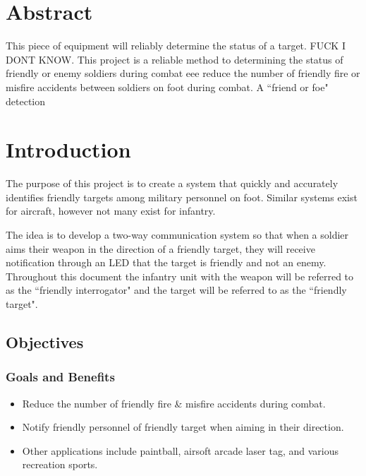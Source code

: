\documentclass[letterpaper,10pt]{article}
\newcommand{\buildtoc}{
	\clearpage
	\singlespacing
	\tableofcontents
	\onehalfspacing
}
\begin{document}
\maketitle
\pagestyle{fancy}
\begin{spacing}{1.15}


\color{black}
\section*{Abstract}
This piece of equipment will reliably determine the status of a target. FUCK I DONT KNOW. This project is a reliable method to determining the status of friendly or enemy soldiers during combat eee reduce the number of friendly fire or misfire accidents between soldiers on foot during combat. A ``friend or foe" detection 
\buildtoc
{}
\clearpage
\setcounter{page}{1}

\section{Introduction}
The purpose of this project is to create a system that quickly and accurately identifies friendly targets among military personnel on foot. Similar systems exist for aircraft, however not many exist for infantry.

The idea is to develop a two-way communication system so that when a soldier aims their weapon in the direction of a friendly target, they will receive notification through an LED that the target is friendly and not an enemy. Throughout this document the infantry unit with the weapon will be referred to as the ``friendly interrogator" and the target will  be referred to as the ``friendly target". 

\subsection{Objectives}
\subsubsection{Goals and Benefits}
\begin{itemize}
	\item Reduce the number of friendly fire \& misfire accidents during combat.
	\item Notify friendly personnel of friendly target when aiming in their direction.
	\item Other applications include paintball, airsoft arcade laser tag, and various recreation sports.
\end{itemize}



\end{spacing}
\end{document}
